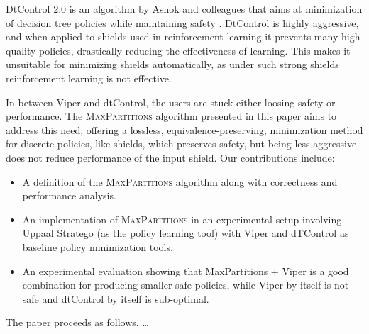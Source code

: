 DtControl 2.0 is an algorithm by Ashok and colleagues that aims at minimization of decision tree policies while maintaining safety \cite{dtControl,dtControl2}.  DtControl is highly aggressive, and when applied to shields used in reinforcement learning it prevents many high quality policies, drastically reducing the effectiveness of learning.  This makes it unsuitable for minimizing shields automatically, as under such strong shields reinforcement learning is not effective.

In between Viper and dtControl, the users are stuck either loosing safety or performance. The \textsc {MaxPartitions} algorithm presented in this paper aims to address this need, offering a lossless, equivalence-preserving, minimization method for discrete policies, like shields, which preserves safety, but being less aggressive does not reduce performance of the input shield. Our contributions include:
%
\begin {itemize}

\item A definition of the \textsc {MaxPartitions} algorithm along with correctness and performance analysis.

\item An implementation of \textsc {MaxPartitions} in an experimental setup involving Uppaal Stratego (as the policy learning tool) with Viper and dTControl as baseline policy minimization tools.

\item An experimental evaluation showing that MaxPartitions + Viper is a good combination for producing smaller safe policies, while Viper by itself is not safe and dtControl by itself is sub-optimal.

\end {itemize}

\noindent
The paper proceeds as follows. \ldots \textcolor {orange} {\lipsum [4]}
